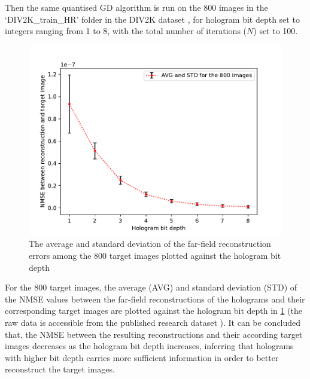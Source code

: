 	Then the same quantised GD algorithm is run on the 800 images in the `DIV2K\_train\_HR' folder in the DIV2K dataset \cite{Agustsson2017}, for hologram bit depth set to integers ranging from 1 to 8, with the total number of iterations ($N$) set to 100.

	\begin{figure} [H]
	   \begin{center}
	   \includegraphics[width = \textwidth]{GS_Fraunhofer_NMSE_VS_Hologram bit depth.pdf}
	   \end{center}
	   \caption{\label{fig:GS_Fraunhofer_NMSE_VS_Hologram_bit_depth} The average and standard deviation of the far-field reconstruction errors among the 800 target images plotted against the hologram bit depth}
	\end{figure}

	For the 800 target images, the average (AVG) and standard deviation (STD) of the NMSE values between the far-field reconstructions of the holograms and their corresponding target images are plotted against the hologram bit depth in \cref{fig:GS_Fraunhofer_NMSE_VS_Hologram_bit_depth} (the raw data is accessible from the published research dataset \cite{research_data_Sha2024}). It can be concluded that, the NMSE between the resulting reconstructions and their according target images decreases as the hologram bit depth increases, inferring that holograms with higher bit depth carries more sufficient information in order to better reconstruct the target images.

